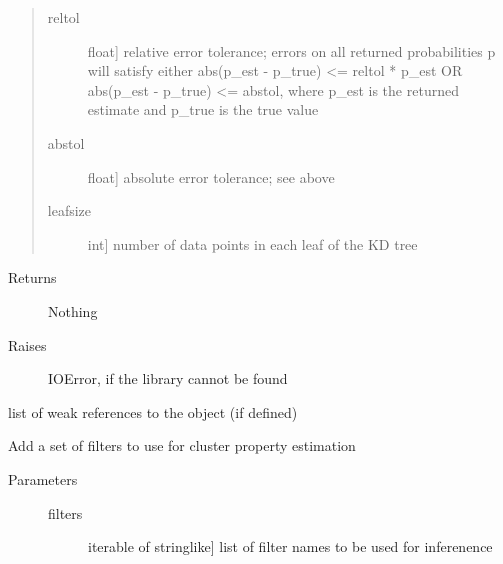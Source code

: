 \documentclass[letterpaper,10pt,english]{sphinxmanual}
\begin{document}
\begin{fulllineitems}
\begin{fulllineitems}
\begin{description}
\begin{quote}
\begin{description}
\item[{reltol}] \leavevmode{[}float{]}
relative error tolerance; errors on all returned
probabilities p will satisfy either
abs(p\_est - p\_true) \textless{}= reltol * p\_est   OR
abs(p\_est - p\_true) \textless{}= abstol,
where p\_est is the returned estimate and p\_true is the
true value

\item[{abstol}] \leavevmode{[}float{]}
absolute error tolerance; see above

\item[{leafsize}] \leavevmode{[}int{]}
number of data points in each leaf of the KD tree

\end{description}
\end{quote}
\begin{description}
\item[{Returns}] \leavevmode
Nothing

\item[{Raises}] \leavevmode
IOError, if the library cannot be found

\end{description}

\end{description}

\end{fulllineitems}


\begin{fulllineitems}
\label{sfr_slug:slugpy.sfr_slug.sfr_slug.__weakref__}
list of weak references to the object (if defined)

\end{fulllineitems}


\begin{fulllineitems}
\label{sfr_slug:slugpy.sfr_slug.sfr_slug.add_filters}
Add a set of filters to use for cluster property estimation
\begin{description}
\item[{Parameters}] \leavevmode\begin{description}
\item[{filters}] \leavevmode{[}iterable of stringlike{]}
list of filter names to be used for inferenence


\end{description}
\end{description}
\end{fulllineitems}
\end{fulllineitems}
\end{document}
